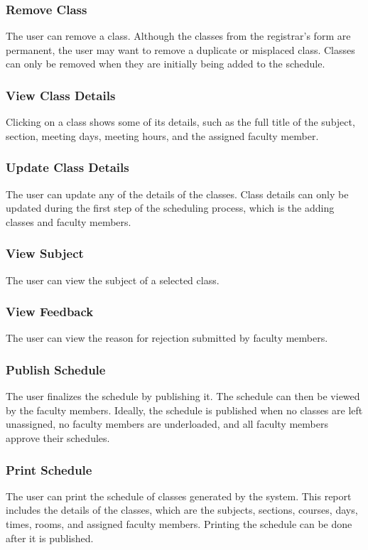         \subsubsection{Remove Class}
        The user can remove a class. Although the classes from the registrar's form are permanent, the user may want to remove a duplicate or misplaced class. Classes can only be removed when they are initially being added to the schedule.
        
        \subsubsection{View Class Details}
        Clicking on a class shows some of its details, such as the full title of the subject, section, meeting days, meeting hours, and the assigned faculty member.
        
        \subsubsection{Update Class Details}
        The user can update any of the details of the classes. Class details can only be updated during the first step of the scheduling process, which is the adding classes and faculty members.
        
        \subsubsection{View Subject}
        The user can view the subject of a selected class.
        
        \subsubsection{View Feedback}
        The user can view the reason for rejection submitted by faculty members.
        
        \subsubsection{Publish Schedule}
        The user finalizes the schedule by publishing it. The schedule can then be viewed by the faculty members. Ideally, the schedule is published when no classes are left unassigned, no faculty members are underloaded, and all faculty members approve their schedules.
        
        \subsubsection{Print Schedule}
        The user can print the schedule of classes generated by the system. This report includes the details of the classes, which are the subjects, sections, courses, days, times, rooms, and assigned faculty members. Printing the schedule can be done after it is published.
        
